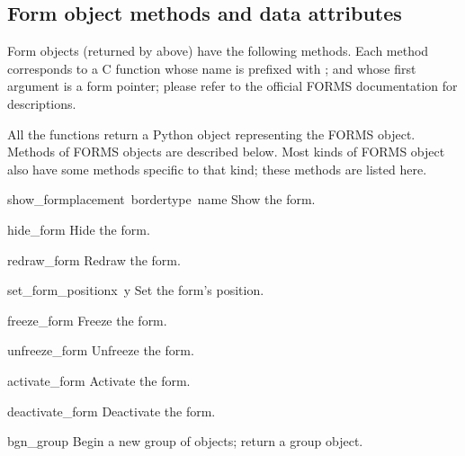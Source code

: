 \subsection{Form object methods and data attributes}

Form objects (returned by  above) have the
following methods.  Each method corresponds to a C function whose name
is prefixed with ; and whose first argument is a form
pointer; please refer to the official FORMS documentation for
descriptions.

All the  functions return a Python object representing
the FORMS object.  Methods of FORMS objects are described below.  Most
kinds of FORMS object also have some methods specific to that kind;
these methods are listed here.

\begin{flushleft}
\renewcommand{\indexsubitem}{(form object method)}
\begin{funcdesc}{show_form}{placement\, bordertype\, name}
  Show the form.
\end{funcdesc}

\begin{funcdesc}{hide_form}{}
  Hide the form.
\end{funcdesc}

\begin{funcdesc}{redraw_form}{}
  Redraw the form.
\end{funcdesc}

\begin{funcdesc}{set_form_position}{x\, y}
Set the form's position.
\end{funcdesc}

\begin{funcdesc}{freeze_form}{}
Freeze the form.
\end{funcdesc}

\begin{funcdesc}{unfreeze_form}{}
  Unfreeze the form.
\end{funcdesc}

\begin{funcdesc}{activate_form}{}
  Activate the form.
\end{funcdesc}

\begin{funcdesc}{deactivate_form}{}
  Deactivate the form.
\end{funcdesc}

\begin{funcdesc}{bgn_group}{}
  Begin a new group of objects; return a group object.
\end{funcdesc}


\end{flushleft}
